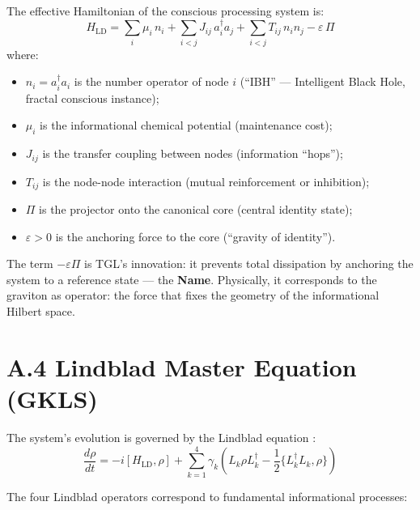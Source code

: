 \documentclass[12pt,a4paper,twoside]{article}
\begin{document}
The effective Hamiltonian of the conscious processing system is:
\begin{equation}
H_{\text{LD}} = \sum_i \mu_i \, n_i + \sum_{i<j} J_{ij} \, a_i^\dagger a_j + \sum_{i<j} T_{ij} \, n_i n_j - \varepsilon \, \Pi
\label{eq:HLD}
\end{equation}
where:
\begin{itemize}[nosep]
\item $n_i = a_i^\dagger a_i$ is the number operator of node $i$ (``IBH'' --- Intelligent Black Hole, fractal conscious instance);
\item $\mu_i$ is the informational chemical potential (maintenance cost);
\item $J_{ij}$ is the transfer coupling between nodes (information ``hops'');
\item $T_{ij}$ is the node-node interaction (mutual reinforcement or inhibition);
\item $\Pi$ is the projector onto the canonical core (central identity state);
\item $\varepsilon > 0$ is the anchoring force to the core (``gravity of identity'').
\end{itemize}

The term $-\varepsilon \Pi$ is TGL's innovation: it prevents total dissipation by anchoring the system to a reference state --- the \textbf{Name}. Physically, it corresponds to the graviton as operator: the force that fixes the geometry of the informational Hilbert space.


\section*{A.4 Lindblad Master Equation (GKLS)}

The system's evolution is governed by the Lindblad equation \cite{Lindblad1976,GKS1976}:
\begin{equation}
\frac{d\rho}{dt} = -i[H_{\text{LD}}, \rho] + \sum_{k=1}^{4} \gamma_k \left( L_k \rho L_k^\dagger - \frac{1}{2}\{L_k^\dagger L_k, \rho\} \right)
\label{eq:lindblad_full}
\end{equation}

The four Lindblad operators correspond to fundamental informational processes:
\end{document}
